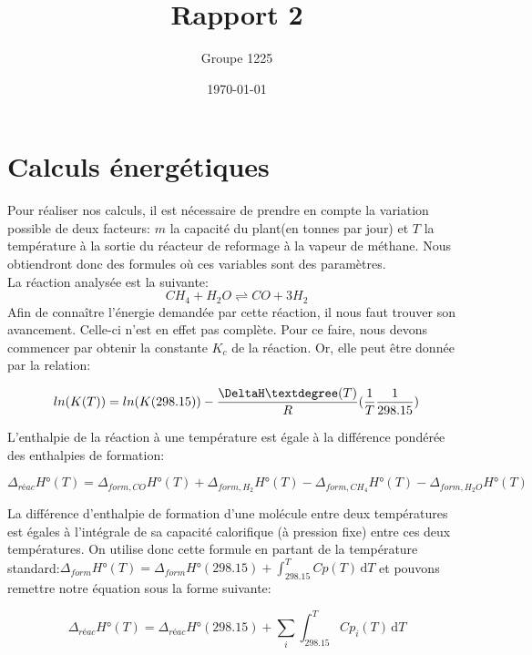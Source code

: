 \documentclass[a4paper, oneside, 12pt]{article}
\title{Rapport 2}
\author{Groupe 1225}
\date{\today}
\begin{document}
\maketitle

\section{Calculs énergétiques}

Pour réaliser nos calculs, il est nécessaire de prendre en compte la variation possible de deux facteurs: $m$ la capacité du plant(en tonnes par jour) et $T$ la température à la sortie du réacteur de reformage à la vapeur de méthane. Nous obtiendront donc des formules où ces variables sont des paramètres.\\
La réaction analysée est la suivante:
\begin{equation}
	CH_4+H_2O \rightleftharpoons CO+3H_2
\end{equation}
Afin de connaître l'énergie demandée par cette réaction, il nous faut trouver son avancement. Celle-ci n'est en effet pas complète. Pour ce faire, nous devons commencer par obtenir la constante $K_{c}$ de la réaction. Or, elle peut être donnée par la relation:

\begin{equation}
	ln(K(T))=ln(K(298.15))-\frac{\DeltaH°(T)}{R}(\frac{1}{T}\frac{1}{298.15})
\end{equation}

L'enthalpie de la réaction à une température est égale à la différence pondérée des enthalpies de formation:

\begin{equation}
	\Delta_{réac}H°(T)=\Delta_{form,CO}H°(T)+\Delta_{form,H_2}H°(T)-\Delta_{form,CH_4}H°(T)-\Delta_{form,H_2O}H°(T)
\end{equation}

La différence d'enthalpie de formation d'une molécule entre deux températures est égales à l'intégrale de sa capacité calorifique (à pression fixe) entre ces deux températures. On utilise donc cette formule en partant de la température standard:$\Delta_{form}H°(T)= \Delta_{form}H°(298.15)+\int_298.15^T Cp(T) \, \mathrm dT$ et pouvons remettre notre équation sous la forme suivante:

\begin{equation}
	\Delta_{réac}H°(T)=\Delta_{réac}H°(298.15)+\sum_i \int_298.15^T Cp_i(T) \, \mathrm dT
\end{equation}
\end{document}
